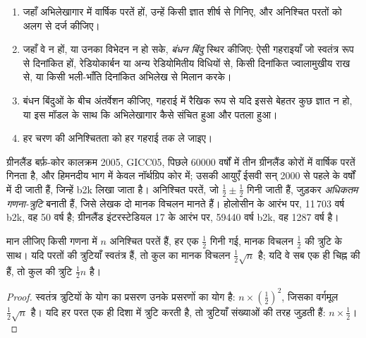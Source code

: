 \begin{method}[आयु-मॉडल बनाना]\label{met:b2:climate-proxies:age-model}
\begin{enumerate}
  \item जहाँ अभिलेखागार में वार्षिक परतें हों, उन्हें किसी ज्ञात शीर्ष से गिनिए, और अनिश्चित परतों को
        अलग से दर्ज कीजिए।
  \item जहाँ वे न हों, या उनका विभेदन न हो सके, \emph{बंधन बिंदु} स्थिर कीजिए: ऐसी गहराइयाँ जो
        स्वतंत्र रूप से दिनांकित हों, रेडियोकार्बन या अन्य रेडियोमितीय विधियों से, किसी दिनांकित ज्वालामुखीय राख से, या
        किसी भली-भाँति दिनांकित अभिलेख से मिलान करके।
  \item बंधन बिंदुओं के बीच अंतर्वेशन कीजिए, गहराई में रैखिक रूप से यदि इससे बेहतर कुछ ज्ञात न हो, या
        इस मॉडल के साथ कि अभिलेखागार कैसे संचित हुआ और पतला हुआ।
  \item हर चरण की अनिश्चितता को हर गहराई तक ले जाइए।
\end{enumerate}
\end{method}

ग्रीनलैंड बर्फ़-कोर कालक्रम 2005, GICC05, पिछले \num{60000} वर्षों में तीन ग्रीनलैंड कोरों में वार्षिक परतें गिनता है, और
हिमनदीय भाग में केवल नॉर्थग्रिप कोर में; उसकी आयुएँ
ईसवी सन् 2000 से पहले के वर्षों में दी जाती हैं, जिन्हें b2k लिखा जाता है। अनिश्चित परतें, जो $\frac12 \pm \frac12$ गिनी जाती हैं,
जुड़कर \emph{अधिकतम गणना-त्रुटि} बनाती हैं, जिसे लेखक दो मानक विचलन मानते हैं।
होलोसीन के आरंभ पर, 11\,703 वर्ष b2k, वह 50 वर्ष है; ग्रीनलैंड
इंटरस्टेडियल 17 के आरंभ पर, \num{59440} वर्ष b2k, वह \num{1287} वर्ष है।

\begin{proposition}[गणना-त्रुटि की वृद्धि]\label{prop:b2:climate-proxies:counting}
मान लीजिए किसी गणना में $n$ अनिश्चित परतें हैं, हर एक $\frac12$ गिनी गई, मानक
विचलन $\frac12$ की त्रुटि के साथ। यदि परतों की त्रुटियाँ स्वतंत्र हैं, तो कुल का मानक विचलन
$\frac12\sqrt{n}$ है; यदि वे सब एक ही चिह्न की हैं, तो कुल की त्रुटि
$\frac12 n$ है।
\end{proposition}

\begin{proof}
स्वतंत्र त्रुटियों के योग का प्रसरण उनके प्रसरणों का योग है: $n \times
(\frac12)^2$, जिसका वर्गमूल $\frac12\sqrt{n}$ है। यदि हर परत एक ही दिशा में त्रुटि करती है, तो
त्रुटियाँ संख्याओं की तरह जुड़ती हैं: $n \times \frac12$।
\end{proof}

